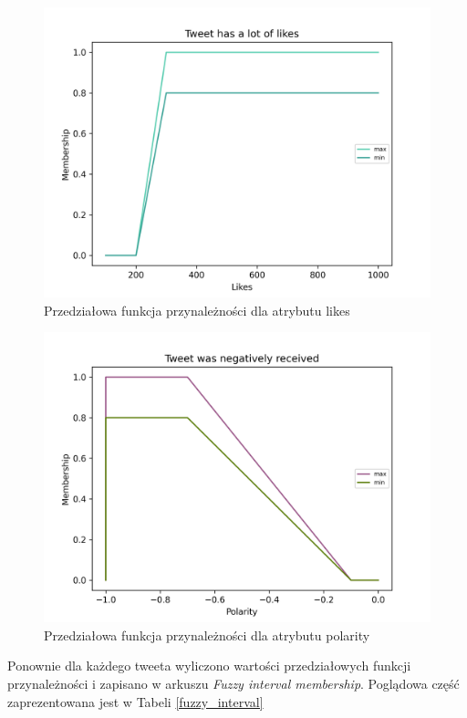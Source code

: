 \documentclass{classrep}
\begin{document}
\begin{figure}[H]
    \centering
    \includegraphics[width=1\textwidth]{resources/stage3/Tweet has a lot of likes.png}
    \caption{Przedziałowa funkcja przynależności dla atrybutu likes}
    \label{very_liked}
\end{figure}

\begin{figure}[H]
    \centering
    \includegraphics[width=1\textwidth]{resources/stage3/Tweet was negatively received.png}
    \caption{Przedziałowa funkcja przynależności dla atrybutu polarity}
    \label{negatively_received}
\end{figure}

Ponownie dla każdego tweeta wyliczono wartości przedziałowych funkcji przynależności i zapisano w arkuszu \textit{Fuzzy interval membership}. Poglądowa część zaprezentowana jest w Tabeli \ref{fuzzy_interval}
\end{document}
